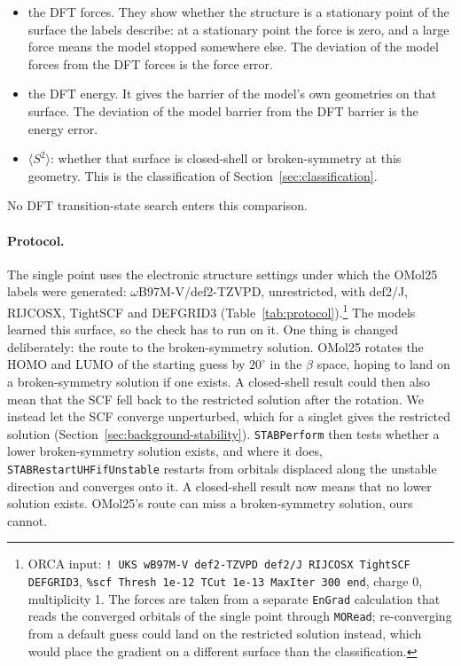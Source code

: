 \begin{itemize}
  \item the DFT forces. They show whether the structure is a stationary
    point of the surface the labels describe: at a stationary point the
    force is zero, and a large force means the model stopped somewhere
    else. The deviation of the model forces from the DFT forces is the
    force error.
  \item the DFT energy. It gives the barrier of the model's own
    geometries on that surface. The deviation of the model barrier from
    the DFT barrier is the energy error.
  \item $\langle S^2\rangle$: whether that surface is closed-shell or
    broken-symmetry at this geometry. This is the classification of
    Section~\ref{sec:classification}.
\end{itemize}

No DFT transition-state search enters this comparison.

\paragraph{Protocol.} The single point uses the electronic structure
settings under which the OMol25 labels were generated:
\mbox{$\omega$B97M-V/def2-TZVPD}, unrestricted, with def2/J, RIJCOSX,
TightSCF and DEFGRID3 (Table~\ref{tab:protocol}).\footnote{ORCA input:
\texttt{! UKS wB97M-V def2-TZVPD def2/J RIJCOSX TightSCF DEFGRID3},
\texttt{\%scf Thresh 1e-12 TCut 1e-13 MaxIter 300 end}, charge 0,
multiplicity 1. The forces are taken from a separate \texttt{EnGrad}
calculation that reads the converged orbitals of the single point
through \texttt{MORead}; re-converging from a default guess could land
on the restricted solution instead, which would place the gradient on a
different surface than the classification.} The models learned this
surface, so the check has to run on it. One thing is changed
deliberately: the route to the broken-symmetry solution. OMol25
rotates the HOMO and LUMO of the starting guess by $20^\circ$ in the
$\beta$ space, hoping to land on a broken-symmetry solution if one
exists. A closed-shell result could then also mean that the SCF fell
back to the restricted solution after the rotation. We instead let
the SCF converge unperturbed, which for a singlet gives the
restricted solution (Section~\ref{sec:background-stability}).
\texttt{STABPerform} then tests whether a lower broken-symmetry
solution exists, and where it does, \texttt{STABRestartUHFifUnstable}
restarts from orbitals displaced along the unstable direction and
converges onto it. A closed-shell
result now means that no lower solution exists. OMol25's route can
miss a broken-symmetry solution, ours cannot.

